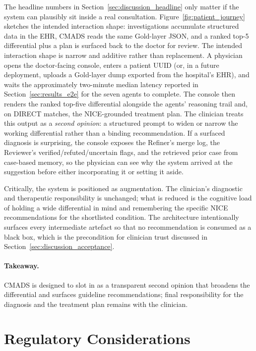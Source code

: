 The headline numbers in Section~\ref{sec:discussion_headline} only
matter if the system can plausibly sit inside a real consultation.
Figure~\ref{fig:patient_journey} sketches the intended interaction
shape: investigations accumulate structured data in the EHR, CMADS
reads the same Gold-layer JSON, and a ranked top-5 differential plus a
plan is surfaced back to the doctor for review.
The intended interaction shape is narrow and additive rather than
replacement. A physician opens the doctor-facing console, enters a
patient UUID (or, in a future deployment, uploads a Gold-layer dump
exported from the hospital's EHR), and waits the
approximately two-minute median latency reported in
Section~\ref{sec:results_e2e} for the seven agents to complete. The
console then renders the ranked top-five differential alongside the
agents' reasoning trail and, on DIRECT matches, the NICE-grounded
treatment plan. The clinician treats this output as a
\emph{second opinion}: a structured prompt to widen or narrow the
working differential rather than a binding recommendation. If a
surfaced diagnosis is surprising, the console exposes the Refiner's
merge log, the Reviewer's verified/refuted/uncertain flags, and the
retrieved prior case from case-based memory, so the physician can
see why the system arrived at the suggestion before either
incorporating it or setting it aside.

Critically, the system is positioned as augmentation. The clinician's
diagnostic and therapeutic responsibility is unchanged; what is
reduced is the cognitive load of holding a wide differential in mind
and remembering the specific NICE recommendations for the
shortlisted condition. The architecture intentionally surfaces every
intermediate artefact so that no recommendation is consumed as a
black box, which is the precondition for clinician trust discussed
in Section~\ref{sec:discussion_acceptance}.

\paragraph{Takeaway.} CMADS is designed to slot in as a transparent
second opinion that broadens the differential and surfaces guideline
recommendations; final responsibility for the diagnosis and the
treatment plan remains with the clinician.

\section{Regulatory Considerations}
\label{sec:discussion_regulation}


